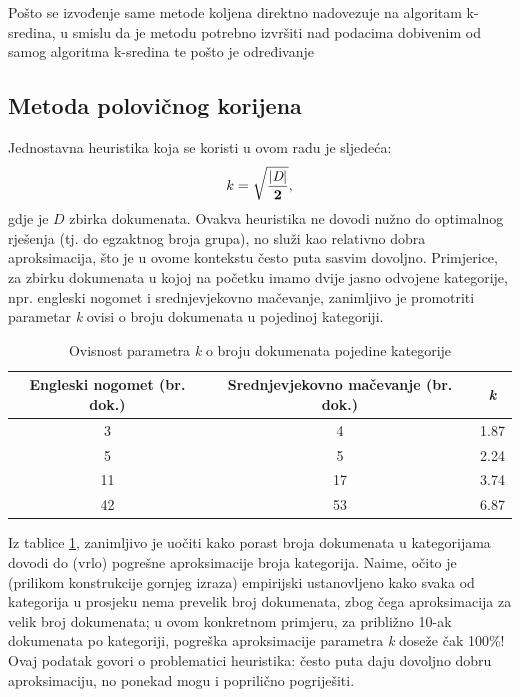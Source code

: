 \documentclass[times, utf8, zavrsni]{fer}
\begin{document}
Pošto se izvođenje same metode koljena direktno nadovezuje na algoritam k-sredina, u smislu da je metodu potrebno izvršiti nad podacima dobivenim od samog algoritma k-sredina te pošto je određivanje

%

\subsection{Metoda polovičnog korijena}

Jednostavna heuristika koja se koristi u ovom radu je sljedeća:
\begin{equation}
{k}={\mathbf {\sqrt{|\textit{D}| \over 2}}},
\end{equation}
gdje je $D$ zbirka dokumenata. Ovakva heuristika ne dovodi nužno do optimalnog rješenja (tj. do egzaktnog broja grupa), no služi kao relativno dobra aproksimacija, što je u ovome kontekstu često puta sasvim dovoljno. Primjerice, za zbirku dokumenata u kojoj na početku imamo dvije jasno odvojene kategorije, npr. engleski nogomet i srednjevjekovno mačevanje, zanimljivo je promotriti parametar \textit{k} ovisi o broju dokumenata u pojedinoj kategoriji.

\begin{table}
\begin{center}
\begin{tabular}{|c|c|c|}
\hline
Engleski nogomet (br. dok.) & Srednjevjekovno mačevanje (br. dok.) & \textit{k} \\
\hline
3 & 4 & 1.87 \\
5 & 5 & 2.24 \\
11 & 17 & 3.74 \\
42 & 53 & 6.87 \\
\hline
\end{tabular}
\end{center}
\caption{Ovisnost parametra \textit{k} o broju dokumenata pojedine kategorije}
\label{table:kmeans}
\end{table}

Iz tablice \ref{table:kmeans}, zanimljivo je uočiti kako porast broja dokumenata u kategorijama dovodi do (vrlo) pogrešne aproksimacije broja kategorija. Naime, očito je (prilikom konstrukcije gornjeg izraza) empirijski ustanovljeno kako svaka od kategorija u prosjeku nema prevelik broj dokumenata, zbog čega aproksimacija za velik broj dokumenata; u ovom konkretnom primjeru, za približno 10-ak dokumenata po kategoriji, pogreška aproksimacije parametra \textit{k} doseže čak 100\%! Ovaj podatak govori o problematici heuristika: često puta daju dovoljno dobru aproksimaciju, no ponekad mogu i poprilično pogriješiti.
\end{document}
